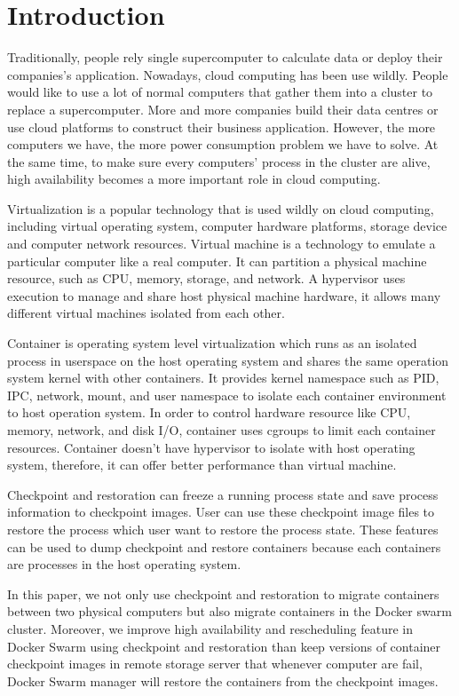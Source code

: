 \chapter{Introduction}
\label{chap:intro}
Traditionally, people rely single supercomputer to calculate data or deploy their companies's application. Nowadays, cloud computing has been use wildly. People would like to use a lot of normal computers that gather them into a cluster to replace a supercomputer. More and more companies build their data centres or use cloud platforms to construct their business application.
However, the more computers we have, the more power consumption problem we have to solve. At the same time, to make sure every computers' process in the cluster are alive, high availability becomes a more important role in cloud computing.

Virtualization is a popular technology that is used wildly on cloud computing,  including virtual operating system, computer hardware platforms, storage device and computer network resources.
Virtual machine is a technology to emulate a particular computer like a real computer. It can partition a physical machine resource, such as CPU, memory, storage, and network.
A hypervisor uses execution to manage and share host physical machine hardware, it allows many different virtual machines isolated from each other.

Container is operating system level virtualization which runs as an isolated process in userspace on the host operating system and shares the same operation system kernel with other containers.
It provides kernel namespace such as PID, IPC, network, mount, and user namespace to isolate each container environment to host operation system.
In order to control hardware resource like CPU, memory, network, and disk I/O, container uses cgroups to limit each container resources.
Container doesn't have hypervisor to isolate with host operating system, therefore, it can offer better performance than virtual machine.

Checkpoint and restoration can freeze a running process state and save process information to checkpoint images. User can use these checkpoint image files to restore the process which user want to restore the process state. These features can be used to dump checkpoint and restore containers because each containers are processes in the host operating system.

In this paper, we not only use checkpoint and restoration to migrate containers between two physical computers but also migrate containers in the Docker swarm cluster.
Moreover, we improve high availability and rescheduling feature in Docker Swarm using checkpoint and restoration than keep versions of container checkpoint images in remote storage server that whenever computer are fail, Docker Swarm manager will restore the containers from the checkpoint images.